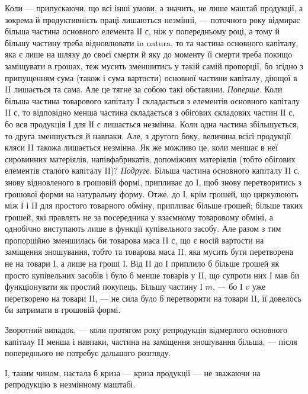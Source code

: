 Коли — припускаючи, що всі інші умови, а значить, не лише маштаб
продукції, а зокрема й продуктивність праці лишаються незмінні, —
поточного року відмирає більша частина основного елемента ІІ $с$, ніж у
попередньому році, а тому й більшу частину треба відновлювати in
natura, то та частина основного капіталу, яка є лише на шляху до своєї
смерти й яку до моменту її смерти треба покищо заміщувати в грошах,
теж мусить зменшитись у такій самій пропорції, бо згідно з припущенням
сума (також і сума вартости) основної частини капіталу, діющої в II
лишається та сама. Але це тягне за собою такі обставини. \emph{Поперше}. Коли
більша частина товарового капіталу І складається з елементів основного
капіталу II $с$, то відповідно менша частина складається з обігових складових
частин ІІ $с$, бо вся продукція І для ІІ $с$ лишається незмінна. Коли одна
частина збільшується, то друга зменшується й навпаки. Але, з другого
боку, величина всієї продукції кляси II такожа лишається незмінна. Як
же можливо це, коли меншає в неї сировинних матеріялів, напівфабрикатів,
допоміжних матеріялів (тобто обігових елементів сталого капіталу II)?
\emph{Подруге}. Більша частина основного капіталу II $с$, знову відновленого в
грошовій формі, припливає до І, щоб знову перетворитись з грошової
форми на натуральну форму. Отже, до І, крім грошей, що циркулюють
між І і II для простого товарного обміну, припливає більше грошей;
більше таких грошей, які правлять не за посередника у взаємному товаровому
обміні, а однобічно виступають лише в функції купівельного
засобу. Але разом з тим пропорційно зменшилась би товарова маса
II $с$, що є носій вартости на заміщення зношування, тобто та товарова
маса II, яка мусить бути перетворена не на товари І, а лише на гроші І.
Від II до І приплило б більше грошей як просто купівельних засобів і
було б менше товарів у II, що супроти них І мав би функціонувати як
простий покупець. Більшу частину І $m$, — бо І $v$ уже перетворено на товари
II, — не сила було б перетворити на товари II, її довелось би затримати в
грошовій формі.

Зворотний випадок, — коли протягом року репродукція відмерлого
основного капіталу II менша і навпаки, частина на заміщення зношування
більша, — після попереднього не потребує дальшого розгляду.

І, таким чином, настала б криза — криза продукції — не зважаючи на
репродукцію в незмінному маштабі.
